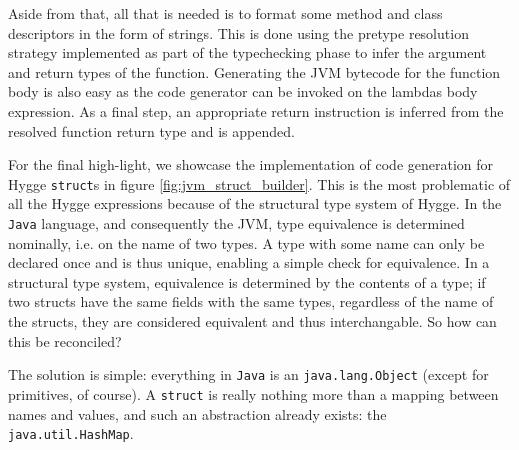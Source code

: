 Aside from that, all that is needed is to format some method and class descriptors in the form of strings. This is done using the pretype resolution strategy
implemented as part of the typechecking phase to infer the argument and return types of the function. Generating the JVM bytecode for the function
body is also easy as the code generator can be invoked on the lambdas body expression. As a final step, an appropriate return instruction is inferred
from the resolved function return type and is appended.

For the final high-light, we showcase the implementation of code generation for Hygge \texttt{struct}s in figure \ref{fig:jvm_struct_builder}.
This is the most problematic of all the Hygge expressions because of the structural type system of Hygge. In the \texttt{Java} language, and consequently the JVM,
type equivalence is determined nominally, i.e. on the name of two types. A type with some name can only be declared once and is thus unique, enabling
a simple check for equivalence. In a structural type system, equivalence is determined by the contents of a type; if two structs have the same fields with
the same types, regardless of the name of the structs, they are considered equivalent and thus interchangable. So how can this be reconciled?

The solution is simple: everything in \texttt{Java} is an \texttt{java.lang.Object} (except for primitives, of course). A \texttt{struct} is really
nothing more than a mapping between names and values, and such an abstraction already exists: the \texttt{java.util.HashMap}. 


